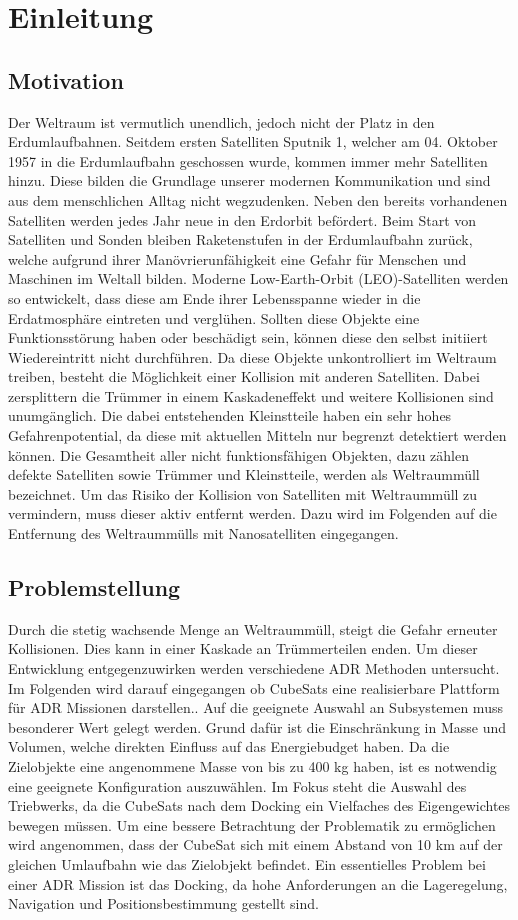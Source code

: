 \chapter{Einleitung}
		\section{Motivation}
		Der Weltraum ist vermutlich unendlich, jedoch nicht der Platz in den Erdumlaufbahnen. Seitdem ersten Satelliten Sputnik 1, welcher am 04. Oktober 1957 in die Erdumlaufbahn geschossen wurde, kommen immer mehr Satelliten hinzu. Diese bilden die Grundlage unserer modernen Kommunikation und sind aus dem menschlichen Alltag nicht wegzudenken. Neben den bereits vorhandenen Satelliten werden jedes Jahr neue in den Erdorbit befördert. Beim Start von Satelliten und Sonden bleiben Raketenstufen in der Erdumlaufbahn zurück, welche aufgrund ihrer Manövrierunfähigkeit eine Gefahr für Menschen und Maschinen im Weltall bilden. Moderne Low-Earth-Orbit (LEO)-Satelliten werden so entwickelt, dass diese am Ende ihrer Lebensspanne wieder in die Erdatmosphäre eintreten und verglühen. 
Sollten diese Objekte eine Funktionsstörung haben oder beschädigt sein, können diese den selbst initiiert Wiedereintritt nicht durchführen. Da diese Objekte unkontrolliert im Weltraum treiben, besteht die Möglichkeit einer Kollision mit anderen Satelliten. Dabei zersplittern die Trümmer in einem Kaskadeneffekt und weitere Kollisionen sind unumgänglich. Die dabei entstehenden Kleinstteile haben ein sehr hohes Gefahrenpotential, da diese mit aktuellen Mitteln nur begrenzt detektiert werden können. 
Die Gesamtheit aller nicht funktionsfähigen Objekten, dazu zählen defekte Satelliten sowie Trümmer und Kleinstteile, werden als Weltraummüll bezeichnet. Um das Risiko der Kollision von Satelliten mit Weltraummüll zu vermindern, muss dieser aktiv entfernt werden. Dazu wird im Folgenden auf die Entfernung des Weltraummülls mit Nanosatelliten eingegangen.

		\section{Problemstellung}
Durch die stetig wachsende Menge an Weltraummüll, steigt die Gefahr erneuter Kollisionen. Dies kann in einer Kaskade an Trümmerteilen enden. Um dieser Entwicklung entgegenzuwirken werden verschiedene ADR Methoden untersucht.
Im Folgenden wird darauf eingegangen ob CubeSats eine realisierbare Plattform für ADR Missionen darstellen..
Auf die geeignete Auswahl an Subsystemen muss besonderer Wert gelegt werden. Grund dafür ist die Einschränkung in Masse und Volumen, welche direkten Einfluss auf das Energiebudget haben. 
Da die Zielobjekte eine angenommene Masse von bis zu 400 kg haben, ist es notwendig eine geeignete Konfiguration auszuwählen. Im Fokus steht die Auswahl des Triebwerks, da die CubeSats nach dem Docking ein Vielfaches des Eigengewichtes bewegen müssen. 
Um eine bessere Betrachtung der Problematik zu ermöglichen wird angenommen, dass der CubeSat sich mit einem Abstand von 10 km auf der gleichen Umlaufbahn wie das Zielobjekt befindet. Ein essentielles Problem bei einer ADR Mission ist das Docking, da hohe Anforderungen an die Lageregelung, Navigation und Positionsbestimmung gestellt sind.


